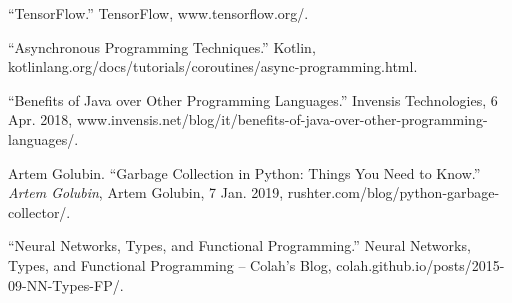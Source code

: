 \begin{thebibliography}{9}
\bibitem{} “TensorFlow.” TensorFlow, www.tensorflow.org/.

\bibitem{} “Asynchronous Programming Techniques.” Kotlin, kotlinlang.org/docs/tutorials/coroutines/async-programming.html.

 
\bibitem{} “Benefits of Java over Other Programming Languages.” Invensis Technologies, 6 Apr. 2018, www.invensis.net/blog/it/benefits-of-java-over-other-programming-languages/.

 
\bibitem{} 
Artem Golubin. “Garbage Collection in Python: Things You Need to Know.” \textit{Artem Golubin}, Artem Golubin, 7 Jan. 2019, rushter.com/blog/python-garbage-collector/.

\bibitem{}
“Neural Networks, Types, and Functional Programming.” Neural Networks, Types, and Functional Programming -- Colah's Blog, colah.github.io/posts/2015-09-NN-Types-FP/. \newline

\end{thebibliography}


